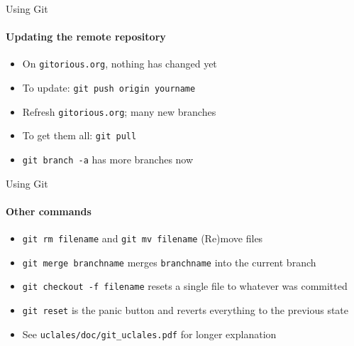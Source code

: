 \documentclass[handout]{beamer}
\newcommand{\code}[1]{{\tt #1}}
\begin{document}
\begin{frame}[<+->]{Using Git}
\framesubtitle{Updating the remote repository}
\begin{itemize}
\item On \code{gitorious.org}, nothing has changed yet
\item To update: \code{git push origin yourname}
\item Refresh \code{gitorious.org}; many new branches
\item To get them all: \code{git pull}
\item \code{git branch -a} has more branches now
\end{itemize}
\end{frame}
\begin{frame}[<+->]{Using Git}
\framesubtitle{Other commands}
\begin{itemize}
\item \code{git rm filename} and \code{git mv filename} (Re)move files
\item \code{git merge branchname} merges \code{branchname} into the current branch
\item  \code{git checkout -f filename} resets a single file to whatever was committed
\item \code{git reset} is the panic button and reverts everything to the previous state
\item See \code{uclales/doc/git\_uclales.pdf} for longer explanation
\end{itemize}

\end{frame}
\end{document}
